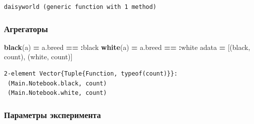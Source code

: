 \documentclass[
  english,
  russian,
  12pt,
  a4paper,
  DIV=11,
  numbers=noendperiod]{scrreprt}
\newenvironment{Shaded}{\begin{snugshade}}{\end{snugshade}}
\newcommand{\FunctionTok}[1]{\textcolor[rgb]{0.13,0.29,0.53}{\textbf{#1}}}
\newcommand{\NormalTok}[1]{#1}
\newcommand{\OperatorTok}[1]{\textcolor[rgb]{0.81,0.36,0.00}{\textbf{#1}}}
\begin{document}
\begin{verbatim}
daisyworld (generic function with 1 method)
\end{verbatim}

\subsubsection{Агрегаторы}\label{ux430ux433ux440ux435ux433ux430ux442ux43eux440ux44b-1}

\begin{Shaded}
\begin{Highlighting}[]
\FunctionTok{black}\NormalTok{(a) }\OperatorTok{=}\NormalTok{ a.breed }\OperatorTok{==} \OperatorTok{:}\NormalTok{black}
\FunctionTok{white}\NormalTok{(a) }\OperatorTok{=}\NormalTok{ a.breed }\OperatorTok{==} \OperatorTok{:}\NormalTok{white}
\NormalTok{adata }\OperatorTok{=}\NormalTok{ [(black, count), (white, count)]}
\end{Highlighting}
\end{Shaded}

\begin{verbatim}
2-element Vector{Tuple{Function, typeof(count)}}:
 (Main.Notebook.black, count)
 (Main.Notebook.white, count)
\end{verbatim}

\subsubsection{Параметры
эксперимента}\label{ux43fux430ux440ux430ux43cux435ux442ux440ux44b-ux44dux43aux441ux43fux435ux440ux438ux43cux435ux43dux442ux430-1}
\end{document}

